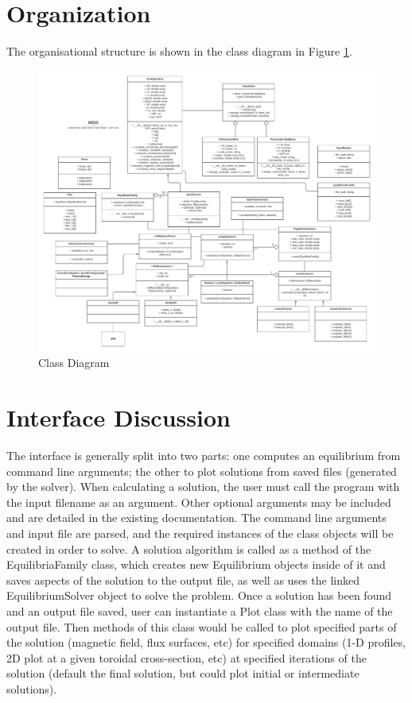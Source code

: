 \documentclass{article}
\begin{document}
\section{Organization} %
The organisational structure is shown in the class diagram in Figure \ref{fig:uml}.
%
\begin{figure}[H]
  \centering
  \includegraphics[width=1.6\linewidth,center]{./figs/UML_06.pdf}
  \caption{Class Diagram}
  \label{fig:uml}
\end{figure}

\section{Interface Discussion}

The interface is generally split into two parts: one computes an equilibrium from command line arguments; the other to plot solutions from saved files (generated by the solver).
When calculating a solution, the user must call the program with the input filename as an argument. Other optional arguments may be included and are detailed in the existing documentation.
The command line arguments and input file are parsed, and the required instances of the class objects will be created in order to solve.
A solution algorithm is called as a method of the EquilibriaFamily class, which creates new Equilibrium objects inside of it and saves aspects of the solution to the output file, as well as uses the linked EquilibriumSolver object to solve the problem.
Once a solution has been found and an output file saved, user can instantiate a Plot class with the name of the output file.
Then methods of this class would be called to plot specified parts of the solution (magnetic field, flux surfaces, etc) for specified domains (1-D profiles, 2D plot at a given toroidal cross-section, etc) at specified iterations of the solution (default the final solution, but could plot initial or intermediate solutions).
\end{document}
